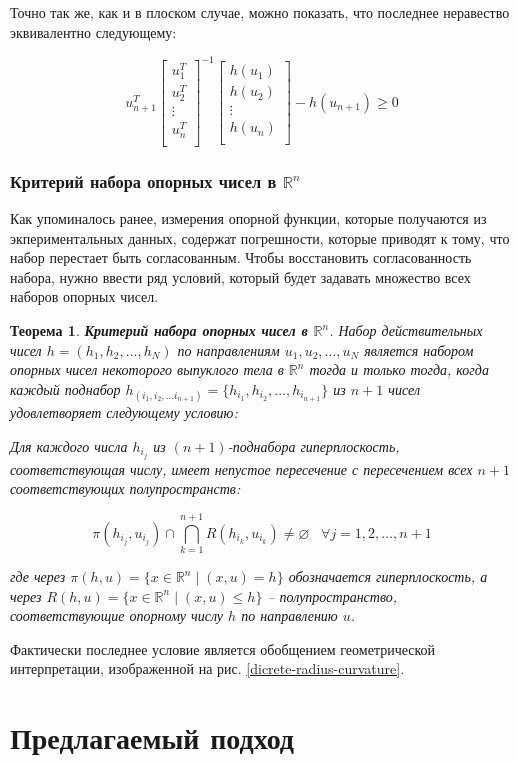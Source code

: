 \documentclass[a4paper, 12pt, titlepage]{article}
\theoremstyle{definition}
\theoremstyle{plain}
\newtheorem{SmartTheorem}{Теорема}
\begin{document}
Точно так же, как и в плоском случае, можно показать, что последнее неравество
эквивалентно следующему:

\begin{equation}
 u_{n + 1}^{T}
 \left[
 \begin{array}{c}
 u_{1}^{T} \\
 u_{2}^{T} \\
 \vdots \\
 u_{n}^{T} \\
 \end{array}
 \right]^{-1}
 \left[
 \begin{array}{c}
 h(u_{1}) \\
 h(u_{2}) \\
 \vdots \\
 h(u_{n}) \\
 \end{array}
 \right] - h(u_{n + 1}) \geq 0
\end{equation}

\subsubsection{Критерий набора опорных чисел в $\mathbb{R}^{n}$}
\label{sec:history/KarlKVW96/support-vector-criterion}

Как упоминалось ранее, измерения опорной функции, которые получаются из
экпериментальных данных, содержат погрешности, которые приводят к тому, что
набор перестает быть согласованным. Чтобы восстановить согласованность набора,
нужно ввести ряд условий, который будет задавать множество всех наборов опорных
чисел.

\begin{SmartTheorem}
 \label{thm:discrete-consistency}
 \textbf{Критерий набора опорных чисел в $\mathbb{R}^{n}$}.
 Набор действительных чисел $h = (h_{1}, h_{2}, \ldots, h_{N})$ по
 направлениям $u_{1}, u_{2}, \ldots, u_{N}$ является набором  опорных чисел
 некоторого выпуклого тела в $\mathbb{R}^{n}$ тогда и только тогда, когда
 каждый поднабор $h_{(i_{1}, i_{2}, \ldots i_{n + 1})} = \{h_{i_{1}}, h_{i_{2}},
 \ldots, h_{i_{n + 1}}\}$ из $n + 1$ чисел удовлетворяет следующему условию:

 Для каждого числа $h_{i_{j}}$ из $(n + 1)$-поднабора гиперплоскость,
 соответствующая числу, имеет непустое пересечение с пересечением всех $n + 1$
 соответствующих полупространств:

 \begin{equation}
  \pi(h_{i_{j}}, u_{i_{j}}) \cap \bigcap \limits_{k = 1}^{n + 1} R(h_{i_{k}}, 
  u_{i_{k}}) \neq \varnothing \;\;\; \forall j = 1, 2, \ldots, n + 1
 \end{equation}

 где через
 $\pi(h, u) = \{x \in \mathbb{R}^{n} \; | \; (x, u) = h\}$
 обозначается  гиперплоскость, а через
 $R(h, u) = \{x \in \mathbb{R}^{n} \; | \; (x, u) \leq h\}$
 -- полупространство, соответствующие опорному числу $h$ по направлению $u$.
\end{SmartTheorem}

Фактически последнее условие является обобщением геометрической интерпретации, 
изображенной на рис. \ref{dicrete-radius-curvature}.


\newpage
\section{Предлагаемый подход}

\newpage


\end{document}
